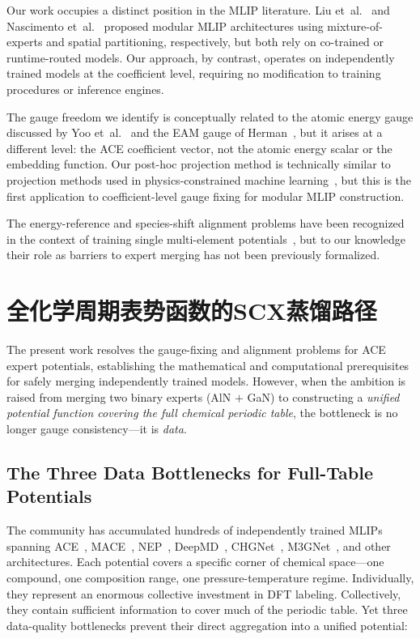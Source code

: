 \documentclass[twoside,prb,aps,floatfix,superscriptaddress,longbibliography]{revtex4-2}
\begin{document}
Our work occupies a distinct position in the MLIP literature. Liu et~al.~\cite{Liu2026ScalingMoE} and Nascimento et~al.~\cite{Nascimento2026MoEFramework} proposed modular MLIP architectures using mixture-of-experts and spatial partitioning, respectively, but both rely on co-trained or runtime-routed models. Our approach, by contrast, operates on independently trained models at the coefficient level, requiring no modification to training procedures or inference engines.

The gauge freedom we identify is conceptually related to the atomic energy gauge discussed by Yoo et~al.~\cite{Yoo2019AtomicEnergyMapping} and the EAM gauge of Herman~\cite{Herman2008EAMGauge}, but it arises at a different level: the ACE coefficient vector, not the atomic energy scalar or the embedding function. Our post-hoc projection method is technically similar to projection methods used in physics-constrained machine learning~\cite{PINNProj2024,KKThPINN2024}, but this is the first application to coefficient-level gauge fixing for modular MLIP construction.

The energy-reference and species-shift alignment problems have been recognized in the context of training single multi-element potentials~\cite{Tanaka2023Alignment}, but to our knowledge their role as barriers to expert merging has not been previously formalized.

\section{全化学周期表势函数的SCX蒸馏路径}
\label{sec:scx_distillation}

The present work resolves the gauge-fixing and alignment problems for ACE expert potentials, establishing the mathematical and computational prerequisites for safely merging independently trained models. However, when the ambition is raised from merging two binary experts (AlN $+$ GaN) to constructing a \emph{unified potential function covering the full chemical periodic table}, the bottleneck is no longer gauge consistency---it is \emph{data}.

\subsection{The Three Data Bottlenecks for Full-Table Potentials}

The community has accumulated hundreds of independently trained MLIPs spanning ACE~\cite{Drautz2019ACE,Lysogorskiy2021PACE}, MACE~\cite{Batatia2022MACE}, NEP~\cite{Fan2022NEP}, DeepMD~\cite{Wang2018DeepMD}, CHGNet~\cite{Deng2023CHGNet}, M3GNet~\cite{Chen2022M3GNet}, and other architectures. Each potential covers a specific corner of chemical space---one compound, one composition range, one pressure-temperature regime. Individually, they represent an enormous collective investment in DFT labeling. Collectively, they contain sufficient information to cover much of the periodic table. Yet three data-quality bottlenecks prevent their direct aggregation into a unified potential:
\end{document}
